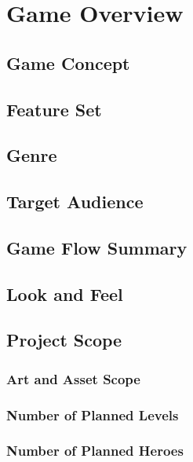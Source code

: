 
\section{Game Overview}

\subsection{Game Concept}

\subsection{Feature Set}

\subsection{Genre}

\subsection{Target Audience}

\subsection{Game Flow Summary}

\subsection{Look and Feel}

\subsection{Project Scope}

\subsubsection{Art and Asset Scope}

\subsubsection{Number of Planned Levels}

\subsubsection{Number of Planned Heroes}

\newpage